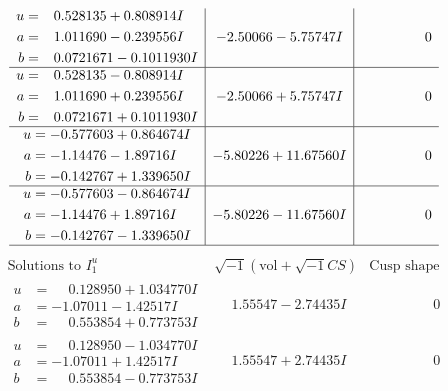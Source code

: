 \documentclass[1p]{elsarticle_modified}
\theoremstyle{definition}
\newcommand{\I}{\sqrt{-1}}
\begin{document}
$$\begin{array}{c|c|c}
\begin{aligned}
u &= \phantom{-}0.528135 + 0.808914 I \\
a &= \phantom{-}1.011690 - 0.239556 I \\
b &= \phantom{-}0.0721671 - 0.1011930 I\end{aligned}
 & -2.50066 - 5.75747 I & \phantom{-0.000000 } 0 \\ \hline\begin{aligned}
u &= \phantom{-}0.528135 - 0.808914 I \\
a &= \phantom{-}1.011690 + 0.239556 I \\
b &= \phantom{-}0.0721671 + 0.1011930 I\end{aligned}
 & -2.50066 + 5.75747 I & \phantom{-0.000000 } 0 \\ \hline\begin{aligned}
u &= -0.577603 + 0.864674 I \\
a &= -1.14476 - 1.89716 I \\
b &= -0.142767 + 1.339650 I\end{aligned}
 & -5.80226 + 11.67560 I & \phantom{-0.000000 } 0 \\ \hline\begin{aligned}
u &= -0.577603 - 0.864674 I \\
a &= -1.14476 + 1.89716 I \\
b &= -0.142767 - 1.339650 I\end{aligned}
 & -5.80226 - 11.67560 I & \phantom{-0.000000 } 0\\
 \hline 
 \end{array}$$\newpage$$\begin{array}{c|c|c}  
\text{Solutions to }I^u_{1}& \I (\text{vol} + \sqrt{-1}CS) & \text{Cusp shape}\\
 \hline 
\begin{aligned}
u &= \phantom{-}0.128950 + 1.034770 I \\
a &= -1.07011 - 1.42517 I \\
b &= \phantom{-}0.553854 + 0.773753 I\end{aligned}
 & \phantom{-}1.55547 - 2.74435 I & \phantom{-0.000000 } 0 \\ \hline\begin{aligned}
u &= \phantom{-}0.128950 - 1.034770 I \\
a &= -1.07011 + 1.42517 I \\
b &= \phantom{-}0.553854 - 0.773753 I\end{aligned}
 & \phantom{-}1.55547 + 2.74435 I & \phantom{-0.000000 } 0 \\ \hline\begin{aligned}

\end{aligned}
\end{array}$$
\end{document}
